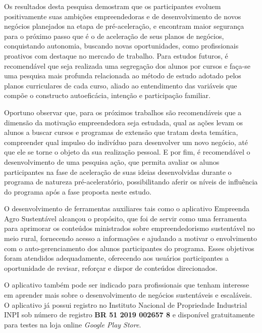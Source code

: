 Os resultados desta pesquisa demostram que os participantes evoluem positivamente suas ambições empreendedoras e de desenvolvimento de novos negócios planejados na etapa de pré-aceleração, e encontram maior segurança para o próximo passo que é o de aceleração de seus planos de negócios, conquistando autonomia, buscando novas oportunidades, como profissionais proativos com destaque no mercado de trabalho.
Para estudos futuros, é recomendável que seja realizada uma segregação dos alunos por cursos e faça-se uma pesquisa mais profunda relacionada ao método de estudo adotado pelos planos curriculares de cada curso, aliado ao entendimento das variáveis que compõe o constructo autoeficácia, intenção e participação familiar.

Oportuno observar que, para os próximos trabalhos são recomendáveis que a dimensão da motivação empreendedora seja estudada, qual as ações levam os alunos a buscar cursos e programas de extensão que tratam desta temática, compreender qual impulso do indivíduo para desenvolver um novo negócio, até que ele se torne o objeto da sua realização pessoal.
E por fim, é recomendável o desenvolvimento de uma pesquisa ação, que permita avaliar os alunos participantes na fase de aceleração de suas ideias desenvolvidas durante o programa de natureza pré-aceleratório, possibilitando aferir os níveis de influência do programa após a fase proposta neste estudo.

O desenvolvimento de ferramentas auxiliares tais como o aplicativo Empreenda Agro Sustentável alcançou o propósito, que foi de servir como uma ferramenta para aprimorar os conteúdos ministrados sobre empreendedorismo sustentável no meio rural, fornecendo acesso a informações e ajudando a motivar o envolvimento com o auto-gerenciamento dos alunos participantes do programa. Esses objetivos foram atendidos adequadamente, oferecendo aos usuários participantes a oportunidade de revisar, reforçar e dispor de conteúdos direcionados.

O aplicativo também pode ser indicado para profissionais que tenham interesse em aprender mais sobre o desenvolvimento de negócios sustentáveis e escaláveis. O aplicativo já possui registro no Instituto Nacional de Propriedade Industrial INPI sob número de registro \textbf{BR 51 2019 002657 8} e disponível gratuitamente para testes na loja online \textit{Google Play Store}.

